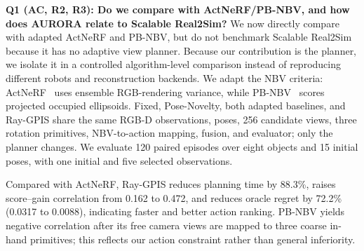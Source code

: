 \documentclass[conference]{IEEEtran}
\begin{document}


\textbf{Q1 (AC, R2, R3): Do we compare with ActNeRF/PB-NBV, and how does AURORA relate to Scalable Real2Sim?}
We now directly compare with adapted ActNeRF and PB-NBV, but do not benchmark
Scalable Real2Sim~\cite{pfaff2025_scalable_real2sim} because it has no adaptive
view planner. Because our contribution is the planner, we isolate it in a
controlled algorithm-level comparison instead of reproducing different robots
and reconstruction backends. We adapt the NBV criteria: ActNeRF~\cite{actnerf}
uses ensemble RGB-rendering variance, while PB-NBV~\cite{pbnbv} scores projected
occupied ellipsoids. Fixed, Pose-Novelty, both adapted baselines, and Ray-GPIS
share the same RGB-D observations, poses, 256 candidate views, three rotation
primitives, NBV-to-action mapping, fusion, and evaluator; only the planner
changes. We evaluate 120 paired episodes over eight objects and 15 initial
poses, with one initial and five selected observations.

Compared with ActNeRF, Ray-GPIS reduces planning time by 88.3\%, raises score--gain correlation from 0.162 to 0.472, and reduces oracle regret by 72.2\% (0.0317 to 0.0088), indicating faster and better action ranking. PB-NBV yields negative correlation after its free camera views are mapped to three coarse in-hand primitives; this reflects our action constraint rather than general inferiority.
\end{document}
